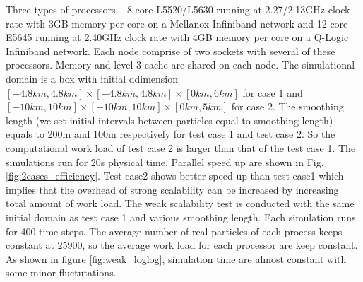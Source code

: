 \documentclass[conference,compsoc]{IEEEtran}
\begin{document}
Three types of processors -- 8 core L5520/L5630 running at 2.27/2.13GHz clock rate with 3GB memory per core on a Mellanox Infiniband network and 12 core E5645 running at 2.40GHz clock rate with 4GB memory per core on a Q-Logic Infiniband network. Each node comprise of two sockets with several of these processors. Memory and level 3 cache are shared on each node. The simulational domain is a box with initial ddimension $[-4.8km, 4.8km]\times [-4.8km, 4.8km] \times [0km, 6km]$ for case 1 and $[-10km, 10km]\times [-10km, 10km] \times [0km, 5km]$ for case 2. The smoothing length (we set initial intervals between particles equal to smoothing length) equals to 200m and 100m respectively for test case 1 and test case 2. So the computational work load of test case 2 is larger than that of the test case 1. The simulations run for 20s physical time.  Parallel speed up are shown in Fig. \ref{fig:2cases_efficiency}. Test case2 shows better speed up than test case1 which implies that the overhead of strong scalability can be increased by increasing total amount of work load.
The weak scalability test is conducted with the same initial domain as test case 1 and various smoothing length. Each simulation runs for 400 time steps. The average number of real particles of each process keeps constant at $25900$, so the average work load for each processor are keep constant. 
As shown in figure \ref{fig:weak_loglog}, simulation time are almost constant with some minor fluctutations.\\
%
%
\end{document}
